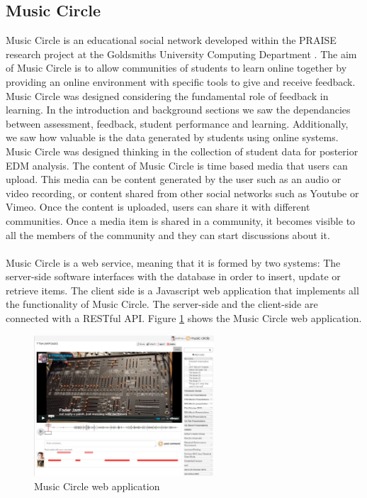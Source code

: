 \documentclass[11pt, oneside]{article}   	%
\begin{document}
\subsection{Music Circle}
Music Circle is an educational social network developed within the PRAISE research project at the Goldsmiths University Computing Department \cite{Yee-king}. The aim of Music Circle is to allow communities of students to learn online together by providing an online environment with specific tools to give and receive feedback. Music Circle was designed considering the fundamental role of feedback in learning. In the introduction and background sections we saw the dependancies between assessment, feedback, student performance and learning. Additionally, we saw how valuable is the data generated by students using online systems. Music Circle was designed thinking in the collection of student data for posterior EDM analysis. The content of Music Circle is time based media that users can upload. This media can be content generated by the user such as an audio or video recording, or content shared from other social networks such as Youtube or Vimeo. Once the content is uploaded, users can share it with different communities. Once a media item is shared in a community, it becomes visible to all the members of the community and they can start discussions about it.\\\\ 
Music Circle is a web service, meaning that it is formed by two systems: The server-side software interfaces with the database in order to insert, update or retrieve items. The client side is a Javascript web application that implements all the functionality of Music Circle. The server-side and the client-side are connected with a RESTful API. Figure \ref{table:musicCircle} shows the Music Circle web application.
\begin{figure}[h!]
  \centering
    \includegraphics[width=0.6\textwidth]{./musicCircle.png}
      \caption{Music Circle web application}
      \label{table:musicCircle}
\end{figure}
\end{document}
